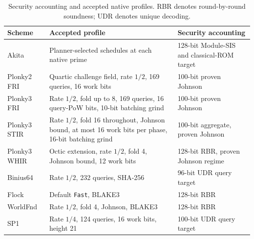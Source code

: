 \begin{table}[t]
\centering
\caption{Security accounting and accepted native profiles. RBR denotes round-by-round soundness; UDR denotes unique decoding.}
\begin{tabularx}{\linewidth}{@{}lXX@{}}
\toprule
Scheme & Accepted profile & Security accounting \\
\midrule
Akita & Planner-selected schedules at each native prime & 128-bit Module-SIS and classical-ROM target \\
Plonky2 FRI & Quartic challenge field, rate $1/2$, 169 queries, 16 work bits & 100-bit proven Johnson \\
Plonky3 FRI & Rate $1/2$, fold up to 8, 169 queries, 16 query-PoW bits, 10-bit batching grind & 100-bit proven Johnson \\
Plonky3 STIR & Rate $1/2$, fold 16 throughout, Johnson bound, at most 16 work bits per phase, 16-bit batching grind & 100-bit aggregate, proven Johnson \\
Plonky3 WHIR & Octic extension, rate $1/2$, fold 4, Johnson bound, 12 work bits & 128-bit RBR, proven Johnson regime \\
Binius64 & Rate $1/2$, 232 queries, SHA-256 & 96-bit UDR query target \\
Flock & Default \texttt{Fast}, BLAKE3 & 128-bit RBR \\
WorldFnd & Rate $1/2$, fold 4, Johnson, BLAKE3 & 128-bit RBR \\
SP1 & Rate $1/4$, 124 queries, 16 work bits, height 21 & 100-bit UDR query target \\
\bottomrule
\end{tabularx}
\end{table}

